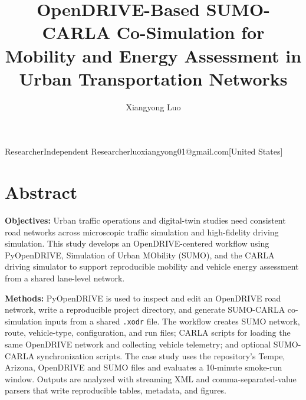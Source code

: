 \documentclass[10pt,numbered]{\selectedmanuscriptclass}
\begin{document}
\title{OpenDRIVE-Based SUMO-CARLA Co-Simulation for Mobility and Energy Assessment in Urban Transportation Networks}

\author*{Xiangyong Luo}{Researcher}{Independent Researcher}{luoxiangyong01@gmail.com}[United States]

\totalpages{}

\maketitle

\section*{Abstract}

\begingroup
\setlength{\parindent}{0pt}

\noindent\textbf{Objectives:} Urban traffic operations and digital-twin studies
need consistent road networks across microscopic traffic simulation and
high-fidelity driving simulation. This study develops an OpenDRIVE-centered
workflow using PyOpenDRIVE, Simulation of Urban MObility (SUMO), and the CARLA
driving simulator to support reproducible mobility and vehicle energy
assessment from a shared lane-level network.

\par\numberedblankline
\noindent\textbf{Methods:} PyOpenDRIVE is used to inspect and edit an
OpenDRIVE road network, write a reproducible project directory, and generate
SUMO-CARLA co-simulation inputs from a shared \texttt{.xodr} file. The workflow
creates SUMO network, route, vehicle-type, configuration, and run files; CARLA
scripts for loading the same OpenDRIVE network and collecting vehicle telemetry;
and optional SUMO-CARLA synchronization scripts. The case study uses the
repository's Tempe, Arizona, OpenDRIVE and SUMO files and evaluates a 10-minute
smoke-run window. Outputs are analyzed with streaming XML and
comma-separated-value parsers that write reproducible tables, metadata, and
figures.
\end{document}
